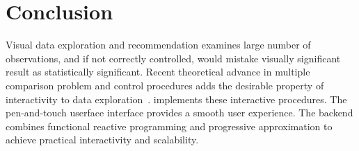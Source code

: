 \section{Conclusion}
\label{sec:conclusion}
Visual data exploration and recommendation examines large number of observations, and if not correctly controlled, would mistake visually significant result as statistically significant.  Recent theoretical advance in multiple comparison problem and control procedures adds the desirable property of interactivity to data exploration~\cite{zhao2016controlling}.  \system{} implements these interactive procedures. The pen-and-touch userface interface provides a smooth user experience.  The \system{} backend combines functional reactive programming and progressive approximation to achieve practical interactivity and scalability.